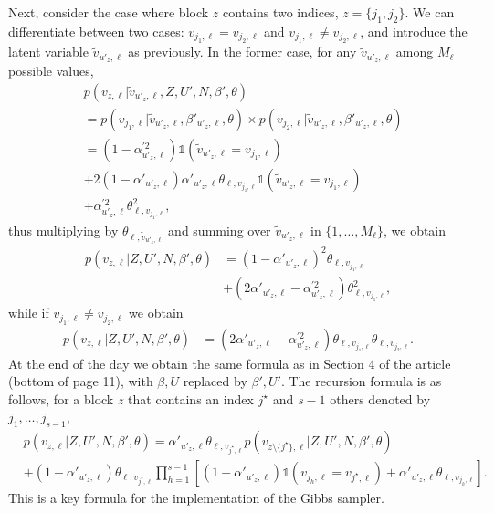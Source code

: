 \documentclass{article}
\begin{document}
Next, consider the case where block $z$ contains
two indices, $z = \{j_1,j_2\}$.
We can differentiate between two cases: $v_{j_1,\ell} = v_{j_2,\ell}$ and  
$v_{j_1,\ell} \neq v_{j_2,\ell}$, and introduce the latent variable $\tilde{v}_{u'_z,\ell}$ as previously. 
In the former case, for any $\tilde{v}_{u'_z,\ell}$ among $M_\ell$ possible values,
\begin{align*}
    &p(v_{z,\ell}|\tilde{v}_{u'_z,\ell},Z,U',N,\beta',\theta)\\
    &= p(v_{j_1,\ell}|\tilde{v}_{u'_z,\ell},\beta'_{u'_z,\ell},\theta)
    \times p(v_{j_2,\ell}|\tilde{v}_{u'_z,\ell},\beta'_{u'_z,\ell},\theta)\\
    &= (1-\alpha^{'2}_{u'_z,\ell}) \mathds{1}(\tilde{v}_{u'_z,\ell} = v_{j_1,\ell}) \\
    &+ 2 (1-\alpha'_{u'_z,\ell}) \alpha'_{u'_z,\ell} \theta_{\ell, v_{j_1,\ell}} \mathds{1}(\tilde{v}_{u'_z,\ell} = v_{j_1,\ell}) \\ 
    &+ \alpha^{'2}_{u'_z,\ell} \theta_{\ell, v_{j_1,\ell}}^2,
\end{align*}
thus multiplying by $\theta_{\ell,\tilde{v}_{u'_z,\ell}}$ and summing over $\tilde{v}_{u'_z,\ell}$ in $\{1,\ldots,M_\ell\}$, we obtain
\begin{align*}
p(v_{z,\ell}|Z,U',N,\beta',\theta) &= (1-\alpha'_{u'_z,\ell})^2 \theta_{\ell,v_{j_1,\ell}} \\ 
&+ (2\alpha'_{u'_z,\ell}-\alpha^{'2}_{u'_z,\ell}) \theta_{\ell, v_{j_1,\ell}}^2,
\end{align*}
while if $v_{j_1,\ell} \neq v_{j_2,\ell}$ we obtain 
\begin{align*}
p(v_{z,\ell}|Z,U',N,\beta',\theta) &=
(2\alpha'_{u'_z,\ell}-\alpha^{'2}_{u'_z,\ell}) \theta_{\ell, v_{j_1,\ell}}\theta_{\ell, v_{j_2,\ell}}.
\end{align*}
At the end of the day we obtain the same formula as in Section 4 of the article (bottom of page 11),
with $\beta,U$ replaced by $\beta',U'$. The recursion formula is as follows,
for a block $z$ that contains an index $j^\star$ and $s-1$ others denoted by $j_1,\ldots,j_{s-1}$,
\begin{equation}
    \label{eq:recursion}
    \begin{split}
        &p(v_{z,\ell}|Z,U',N,\beta',\theta) =
        \alpha'_{u'_z, \ell} \theta_{\ell, v_{j^\star,\ell}}
        p(v_{z\setminus\{j^\star\}, \ell}|Z,U',N,\beta', \theta) \\
        &+ (1-\alpha'_{u'_z, \ell}) \theta_{\ell,v_{j^\star,\ell}} 
        \prod_{h=1}^{s-1} \left[ (1-\alpha'_{u'_z, \ell})\mathds{1}(v_{j_h,\ell}=v_{j^\star,\ell}) + \alpha'_{u'_z, \ell} \theta_{\ell,v_{j_h,\ell}}\right].
    \end{split}
\end{equation}
This is a key formula for the implementation
of the Gibbs sampler.
\end{document}
